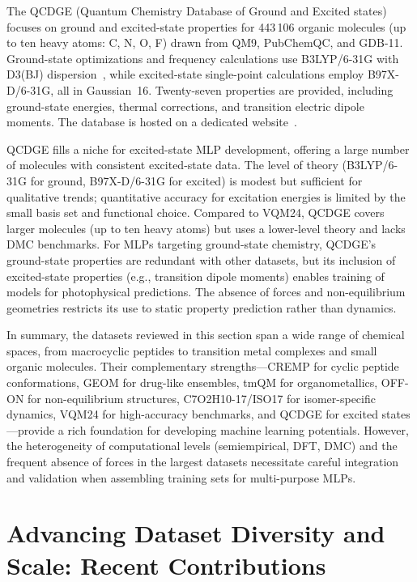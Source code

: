 \documentclass[12pt]{article}
\begin{document}
The QCDGE (Quantum Chemistry Database of Ground and Excited states)~\cite{ds40-30} focuses on ground and excited-state properties for 443\,106 organic molecules (up to ten heavy atoms: C, N, O, F) drawn from QM9, PubChemQC, and GDB-11. Ground-state optimizations and frequency calculations use B3LYP/6-31G with D3(BJ) dispersion~\cite{ds40-175}, while excited-state single-point calculations employ B97X-D/6-31G, all in Gaussian~16. Twenty-seven properties are provided, including ground-state energies, thermal corrections, and transition electric dipole moments. The database is hosted on a dedicated website~\cite{ds40-187}.

QCDGE fills a niche for excited-state MLP development, offering a large number of molecules with consistent excited-state data. The level of theory (B3LYP/6-31G for ground, B97X-D/6-31G for excited) is modest but sufficient for qualitative trends; quantitative accuracy for excitation energies is limited by the small basis set and functional choice. Compared to VQM24, QCDGE covers larger molecules (up to ten heavy atoms) but uses a lower-level theory and lacks DMC benchmarks. For MLPs targeting ground-state chemistry, QCDGE's ground-state properties are redundant with other datasets, but its inclusion of excited-state properties (e.g., transition dipole moments) enables training of models for photophysical predictions. The absence of forces and non-equilibrium geometries restricts its use to static property prediction rather than dynamics.

In summary, the datasets reviewed in this section span a wide range of chemical spaces, from macrocyclic peptides to transition metal complexes and small organic molecules. Their complementary strengths—CREMP for cyclic peptide conformations, GEOM for drug-like ensembles, tmQM for organometallics, OFF-ON for non-equilibrium structures, C7O2H10-17/ISO17 for isomer-specific dynamics, VQM24 for high-accuracy benchmarks, and QCDGE for excited states—provide a rich foundation for developing machine learning potentials. However, the heterogeneity of computational levels (semiempirical, DFT, DMC) and the frequent absence of forces in the largest datasets necessitate careful integration and validation when assembling training sets for multi-purpose MLPs.

\section{Advancing Dataset Diversity and Scale: Recent Contributions}
\end{document}
